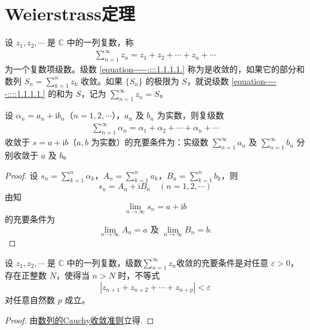 \documentclass[../../main.tex]{subfiles}%
\begin{document}
\section{Weierstrass定理}

\begin{definition}
设 \( z_1, z_2, \cdots \) 是 \( \mathbb{C} \) 中的一列复数，称
\begin{align}
\sum_{n=1}^{\infty} z_n = z_1 + z_2 + \cdots + z_n + \cdots \label{equation-----::::1.1.1.1.}
\end{align}
为一个复数项级数。级数 \eqref{equation-----::::1.1.1.1.} 称为是收敛的，如果它的部分和数列 \( S_n = \sum_{k=1}^{n} z_k \) 收敛。如果 \( \{S_n\} \) 的极限为 \( S \)，就说级数 \eqref{equation-----::::1.1.1.1.} 的和为 \( S \)，记为 \( \sum_{n=1}^{\infty} z_n = S \)。
\end{definition}

\begin{theorem}\label{theorem:复数项级数收敛充要条件}
设 $\alpha_n = a_n + \mathrm{i}b_n$（$n = 1,2,\cdots$），$a_n$ 及 $b_n$ 为实数，则复级数
\begin{align*}
\sum_{n=1}^{\infty}{\alpha _n}=\alpha _1+\alpha _2+\cdots +\alpha _n+\cdots 
\end{align*}
收敛于 $s = a + \mathrm{i}b$（$a,b$ 为实数）的充要条件为：实级数 $\sum_{n = 1}^{\infty} a_n$ 及 $\sum_{n = 1}^{\infty} b_n$ 分别收敛于 $a$ 及 $b$。
\end{theorem}
\begin{proof}
设 $s_n = \sum_{k = 1}^{n} \alpha_k$，$A_n = \sum_{k = 1}^{n} a_k$，$B_n = \sum_{k = 1}^{n} b_k$，则
\[
s_n = A_n + \mathrm{i}B_n \quad (n = 1,2,\cdots)
\]
由知
\[
\lim_{n \to \infty} s_n = a + \mathrm{i}b
\]
的充要条件为
\[
\lim_{n \to \infty} A_n = a \text{ 及 } \lim_{n \to \infty} B_n = b.
\]
\end{proof}

\begin{theorem}[Cauchy收敛准则]\label{theorem:复数域级数收敛的Cauchy收敛准则}
设 \( z_1, z_2, \cdots \) 是 \( \mathbb{C} \) 中的一列复数，级数$\sum_{n=1}^{\infty} z_n$收敛的充要条件是对任意 \( \varepsilon > 0 \)，存在正整数 \( N \)，使得当 \( n > N \) 时，不等式
\[
|z_{n + 1} + z_{n + 2} + \cdots + z_{n + p}| < \varepsilon
\]
对任意自然数 \( p \) 成立。
\end{theorem}
\begin{proof}
由\hyperref[theorem:复数域的Cauchy收敛准则]{数列的Cauchy收敛准则}立得.
\end{proof}
\end{document}
